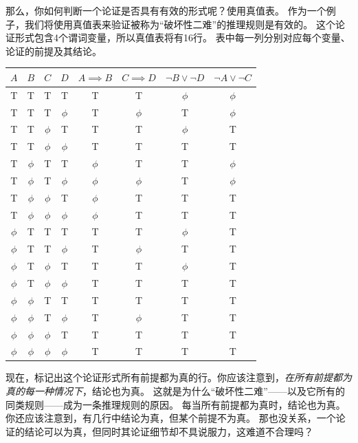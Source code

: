 那么，你如何判断一个论证是否具有有效的形式呢？使用真值表。
作为一个例子，我们将使用真值表来验证被称为“破坏性二难”的推理规则是有效的。
这个论证形式包含4个谓词变量，所以真值表将有16行。
表中每一列分别对应每个变量、论证的前提及其结论。

\begin{center}
\begin{tabular}{cccc|c|c|c|c|}
$A$   & $B$   & $C$   & $D$   & $A{\implies}B$ & $C{\implies}D$ & ${\lnot}B \lor {\lnot}D$ & ${\lnot}A \lor {\lnot}C$ \\ \hline
T     & T     & T     & T     & T     & T     & $\phi$ & $\phi$ \\
T     & T     & T     & $\phi$ & T     & $\phi$ & T     & $\phi$ \\
T     & T     & $\phi$ & T     & T     & T     & $\phi$ & T     \\
T     & T     & $\phi$ & $\phi$ & T     & T     & T     & T     \\
T     & $\phi$ & T     & T     & $\phi$ & T     & T     & $\phi$ \\
T     & $\phi$ & T     & $\phi$ & $\phi$ & $\phi$ & T     & $\phi$ \\
T     & $\phi$ & $\phi$ & T     & $\phi$ & T     & T     & T     \\
T     & $\phi$ & $\phi$ & $\phi$ & $\phi$ & T     & T     & T     \\ 
$\phi$ & T     & T     & T     & T     & T     & $\phi$ & T     \\
$\phi$ & T     & T     & $\phi$ & T     & $\phi$ & T     & T     \\
$\phi$ & T     & $\phi$ & T     & T     & T     & $\phi$ & T     \\
$\phi$ & T     & $\phi$ & $\phi$ & T     & T     & T     & T     \\
$\phi$ & $\phi$ & T     & T     & T     & T     & T     & T     \\
$\phi$ & $\phi$ & T     & $\phi$ & T     & $\phi$ & T     & T     \\
$\phi$ & $\phi$ & $\phi$ & T     & T     & T     & T     & T     \\
$\phi$ & $\phi$ & $\phi$ & $\phi$ & T     & T     & T     & T     \\
\end{tabular}
\end{center}

现在，标记出这个论证形式所有前提都为真的行。你应该注意到，{\em 在所有前提都为真的每一种情况下}，结论也为真。
这就是为什么“破坏性二难”——以及它所有的同类规则——成为一条推理规则的原因。
每当所有前提都为真时，结论也为真。
你还应该注意到，有几行中结论为真，但某个前提不为真。
那也没关系，一个论证的结论可以为真，但同时其论证细节却不具说服力，这难道不合理吗？


